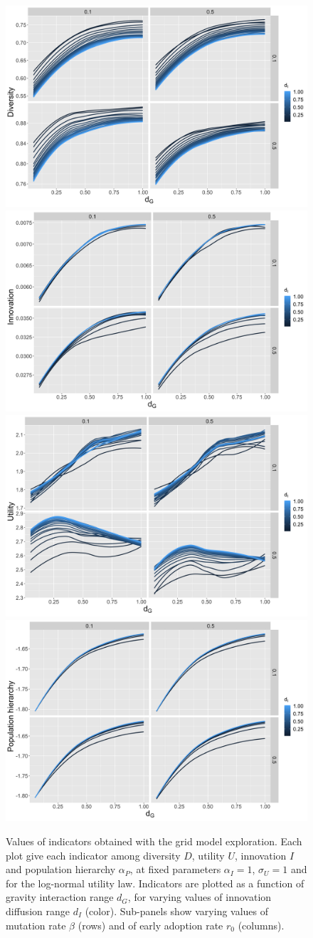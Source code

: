 \documentclass[letterpaper]{article}
\begin{document}
\begin{figure}[t]
	\centering
	\includegraphics[width=0.49\linewidth]{averageDiversity-gravityDecay_color-innovationDecay_facet-mutationRate-earlyAdoptersRate_newInnovationHierarchy1_distriblog-normal.png}
	\includegraphics[width=0.49\linewidth]{averageInnovation-gravityDecay_color-innovationDecay_facet-mutationRate-earlyAdoptersRate_newInnovationHierarchy1_distriblog-normal.png}
	\includegraphics[width=0.49\linewidth]{averageUtility-gravityDecay_color-innovationDecay_facet-mutationRate-earlyAdoptersRate_newInnovationHierarchy1_distriblog-normal.png}
	\includegraphics[width=0.49\linewidth]{finalHierarchy-gravityDecay_color-innovationDecay_facet-mutationRate-earlyAdoptersRate_newInnovationHierarchy1_distriblog-normal.png}
	\caption{Values of indicators obtained with the grid model exploration. Each plot give each indicator among diversity $D$, utility $U$, innovation $I$ and population hierarchy $\alpha_P$, at fixed parameters $\alpha_I = 1$, $\sigma_U = 1$ and for the log-normal utility law. Indicators are plotted as a function of gravity interaction range $d_G$, for varying values of innovation diffusion range $d_I$ (color). Sub-panels show varying values of mutation rate $\beta$ (rows) and of early adoption rate $r_0$ (columns).\label{fig:exploration}}
\end{figure}
\end{document}
